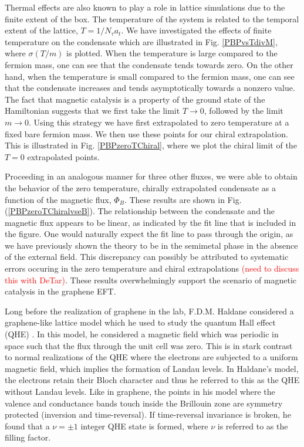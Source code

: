 \documentclass[aps,prd,twocolumn,showpacs,superscriptaddress,groupedaddress]{revtex4}  %
\begin{document}
Thermal effects are also known to play a role in lattice simulations due to the finite extent of the box. The temperature of the system is related to the temporal extent of the lattice, $T = 1/N_{\tau}a_t$. We have investigated the effects of finite temperature on the condensate which are illustrated in Fig. \ref{PBPvsTdivM}, where $\sigma(T/m)$ is plotted. When the temperature is large 
compared to the fermion mass, one can see that the condensate tends towards zero. On the other hand, when the temperature is small compared to the fermion mass, one can see that the condensate increases and tends asymptotically towards a nonzero value. The fact that magnetic catalysis is a property of the ground state of the Hamiltonian suggests that we first take the limit $T \to 0$, followed
by the limit $m \to 0$. Using this strategy we have first extrapolated to zero temperature at a fixed bare fermion mass. We then use these points for our chiral extrapolation. This is illustrated in Fig. \ref{PBPzeroTChiral}, where we plot the chiral limit of the $T=0$ extrapolated points.

Proceeding in an analogous manner for three other fluxes, we were able to obtain the behavior of the zero temperature, chirally extrapolated condensate as a function of the magnetic flux, $\Phi_B$. These results are shown in Fig. (\ref{PBPzeroTChiralvseB}).
The relationship between the condensate and the magnetic flux appears to be linear, as indicated by the fit line that is included in the figure. One would naturally expect the fit line to pass through the origin, as we have previously shown the theory to be in the semimetal phase in the absence of the external field.
This discrepancy can possibly be attributed to systematic errors occuring in the zero temperature and chiral extrapolations \textcolor{red}{(need to discuss this with DeTar)}. These results overwhelmingly support the scenario of magnetic catalysis in the graphene EFT.

Long before the realization of graphene in the lab, F.D.M. Haldane considered a graphene-like lattice model which he used to study the quantum Hall effect (QHE) \cite{Haldane}.
In this model, he considered a magnetic field which was periodic in space such that the flux through the unit cell was zero. This is in stark contrast to normal realizations of the QHE 
where the electrons are subjected to a uniform magnetic field, which implies the formation of Landau levels. In Haldane's model, the electrons retain their Bloch character and thus he referred to 
this as the QHE without Landau levels. Like in graphene, the points in his model where the valence and conductance bands touch inside the Brillouin zone are symmetry protected (inversion and time-reversal).
If time-reversal invariance is broken, he found that a $\nu = \pm 1$ integer QHE state is formed, where $\nu$ is referred to as the filling factor. 
\end{document}
